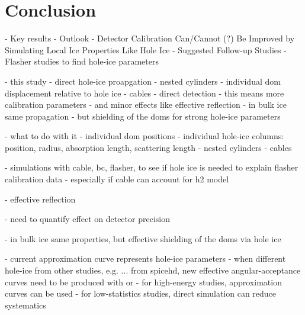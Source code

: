 
\section{Conclusion}
\label{sec:conclusion}

- Key results
- Outlook
- Detector Calibration Can/Cannot (?) Be Improved by Simulating Local Ice Properties Like Hole Ice
- Suggested Follow-up Studies
  - Flasher studies to find hole-ice parameters

- this study
- direct hole-ice proapgation
- nested cylinders
- individual dom displacement relative to hole ice
- cables
- direct detection
- this means more calibration parameters
- and minor effects like effective reflection
- in bulk ice same propagation
- but shielding of the doms for strong hole-ice parameters

- what to do with it
  - individual dom positions
  - individual hole-ice columns: position, radius, absorption length, scattering length
  - nested cylinders
  - cables

- simulations with cable, bc, flasher, to see if hole ice is needed to explain flasher calibration data
- especially if cable can account for h2 model

- effective reflection

- need to quantify effect on detector precision

- in bulk ice same properties, but effective shielding of the doms via hole ice

- current approximation curve represents hole-ice parameters
- when different hole-ice from other studies, e.g. ... from spicehd, new effective angular-acceptance curves need to be produced with \ppc or \clsim
- for high-energy studies, approximation curves can be used
- for low-statistics studies, direct simulation can reduce systematics

